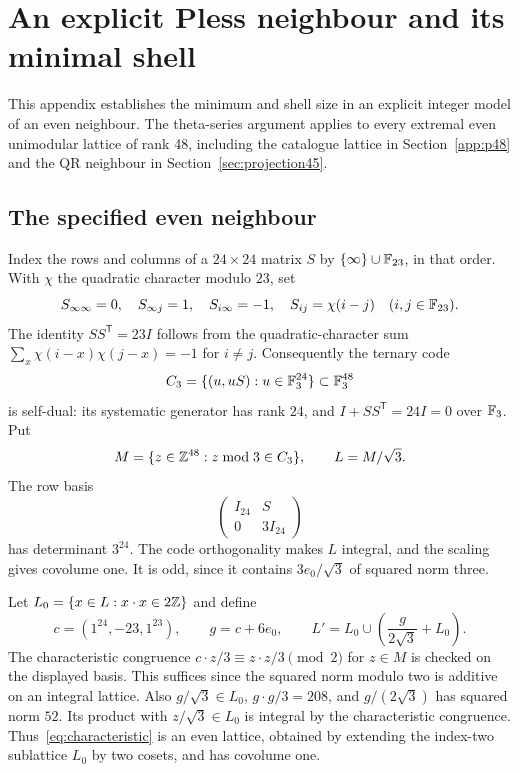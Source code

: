 \section{An explicit Pless neighbour and its minimal shell}\label{app:pless-neighbour}

This appendix establishes the minimum and shell size in an explicit
integer model of an even neighbour. The theta-series argument applies
to every extremal even unimodular lattice of rank 48, including the
catalogue lattice in Section~\ref{app:p48} and the QR neighbour in
Section~\ref{sec:projection45}.

\subsection{The specified even neighbour}
Index the rows and columns of a $24\times24$ matrix $S$ by
$\{\infty\}\cup\mathbb F_{23}$, in that order. With $\chi$ the quadratic
character modulo $23$, set
\begin{equation}\label{eq:paley}
 S_{\infty\infty}=0,\quad S_{\infty j}=1,\quad S_{i\infty}=-1,
 \quad S_{ij}=\chi(i-j)\quad(i,j\in\mathbb F_{23}).
\end{equation}
The identity $SS^{\mathsf T}=23I$ follows from the quadratic-character
sum $\sum_x\chi(i-x)\chi(j-x)=-1$ for $i\ne j$. Consequently the
ternary code
\[
 C_3=\{(u,uS):u\in\mathbb F_3^{24}\}\subset\mathbb F_3^{48}
\]
is self-dual: its systematic generator has rank $24$, and
$I+SS^{\mathsf T}=24I=0$ over $\mathbb F_3$. Put
\begin{equation}\label{eq:construction-A}
 M=\{z\in\mathbb Z^{48}:z\bmod3\in C_3\},\qquad L=M/\sqrt3.
\end{equation}
The row basis
\[
 \begin{pmatrix}I_{24}&S\\0&3I_{24}\end{pmatrix}
\]
has determinant $3^{24}$. The code orthogonality makes $L$ integral,
and the scaling gives covolume one. It is odd, since it contains
$3e_0/\sqrt3$ of squared norm three.

Let $L_0=\{x\in L:x\cdot x\in2\mathbb Z\}$ and define
\begin{equation}\label{eq:characteristic}
 c=(1^{24},-23,1^{23}),\qquad g=c+6e_0,
 \qquad L'=L_0\cup\left(\frac{g}{2\sqrt3}+L_0\right).
\end{equation}
The characteristic congruence
$c\cdot z/3\equiv z\cdot z/3\pmod2$ for $z\in M$ is checked on
the displayed basis. This suffices since the squared norm modulo two
is additive on an integral lattice. Also $g/\sqrt3\in L_0$,
$g\cdot g/3=208$, and $g/(2\sqrt3)$ has squared norm $52$.
Its product with $z/\sqrt3\in L_0$ is integral by the characteristic
congruence. Thus~\eqref{eq:characteristic} is an even lattice, obtained
by extending the index-two sublattice $L_0$ by two cosets, and has
covolume one.


